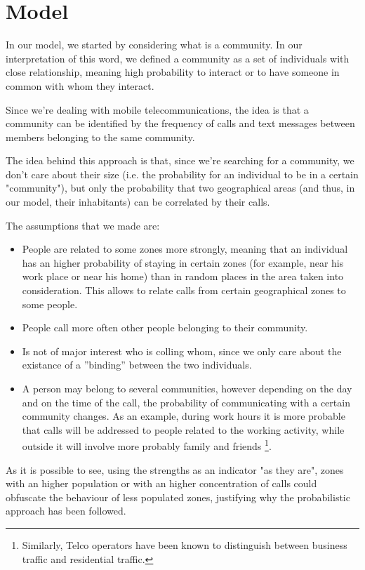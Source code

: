 \section{Model}
In our model, we started by considering what is a community. In our interpretation of this word,
we defined a community as a set of individuals with close relationship, meaning high probability to interact or to have someone in common with whom they interact.

Since we're dealing with mobile telecommunications, the idea is that a community can be identified by the frequency of calls and text messages between members belonging
to the same community.

The idea behind this approach is that, since we're searching for a community, we don't care about their size (i.e. the probability for an individual to be in a certain "community"), 
but only the probability that two geographical areas (and thus, in our model, their inhabitants) can be correlated by their calls.

The assumptions that we made are:
\begin{itemize}
\item People are related to some zones more strongly, meaning that an individual 
has an higher probability of staying in certain zones (for example, near his work place or near his home) than in random places
in the area taken into consideration. This allows to relate calls from certain geographical zones to some people.
\item People call more often other people belonging to their community.
\item Is not of major interest who is colling whom, since we only care about the existance of a ''binding'' between the two individuals.
\item A person may belong to several communities, however depending on the day and on the time of the call, the probability of communicating with a certain community changes.
As an example, during work hours it is more probable that calls will be addressed to people related to the working activity, while outside it will involve more probably family and friends
\footnote{Similarly, Telco operators have been known to distinguish between business traffic and residential traffic.}.
\end{itemize}

As it is possible to see, using the strengths as an indicator "as they are", zones with an higher population or with an higher concentration of calls could obfuscate the behaviour of less populated zones, justifying why the probabilistic approach has been followed.

